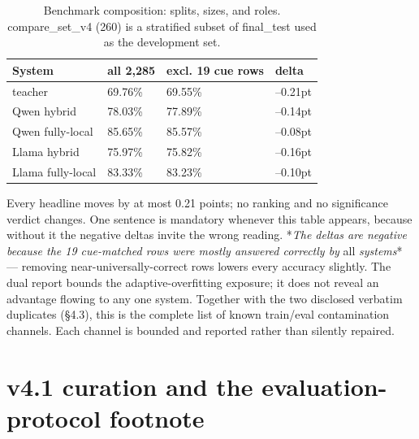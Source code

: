 \begin{table}[t]
\centering
\small
\caption{Benchmark composition: splits, sizes, and roles. compare\_set\_v4 (260) is a stratified subset of final\_test used as the development set.}
\label{tab:04_benchmark_1}
\begin{tabular}{llll}
\toprule
System & all 2,285 & excl. 19 cue rows & delta \\
\midrule
teacher & 69.76\% & 69.55\% & --0.21pt \\
Qwen hybrid & 78.03\% & 77.89\% & --0.14pt \\
Qwen fully-local & 85.65\% & 85.57\% & --0.08pt \\
Llama hybrid & 75.97\% & 75.82\% & --0.16pt \\
Llama fully-local & 83.33\% & 83.23\% & --0.10pt \\
\bottomrule
\end{tabular}
\end{table}


Every headline moves by at most 0.21 points; no ranking and no significance verdict changes. One sentence is mandatory whenever this table appears, because without it the negative deltas invite the wrong reading. *\emph{The deltas are negative because the 19 cue-matched rows were mostly answered correctly by }all\emph{ systems}* --- removing near-universally-correct rows lowers every accuracy slightly. The dual report bounds the adaptive-overfitting exposure; it does not reveal an advantage flowing to any one system. Together with the two disclosed verbatim duplicates (§4.3), this is the complete list of known train/eval contamination channels. Each channel is bounded and reported rather than silently repaired.

\section{v4.1 curation and the evaluation-protocol footnote}\label{sec:v4-1-curation-and-the-evaluation-protoco}

